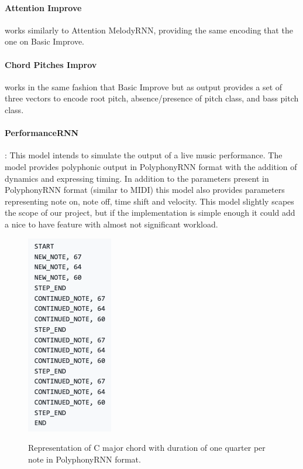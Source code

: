\paragraph{Attention Improve} works similarly to Attention MelodyRNN, providing the same
encoding that the one on Basic Improve.

\paragraph{Chord Pitches Improv} works in the same fashion that Basic Improve but as
output provides a set of three vectors to encode root pitch, absence/presence of pitch
class, and bass pitch class.

\paragraph{PerformanceRNN}: This model intends to simulate the output of a live music
performance. The model provides polyphonic output in PolyphonyRNN format with the addition
of dynamics and expressing timing. In addition to the parameters present in PolyphonyRNN
format (similar to MIDI) this model also provides parameters representing note on, note
off, time shift and velocity. This model slightly scapes the scope of our project, but if
the implementation is simple enough it could add a nice to have feature with almost not
significant workload.

\begin{figure}[h!]
  \centering
  \caption{Representation of C major chord with duration of one quarter per note in PolyphonyRNN format.}
  \includegraphics[width=0.3 \linewidth]{image/fig_JDF30.png}
  \label{figure:polyrnnformat}
\end{figure}

